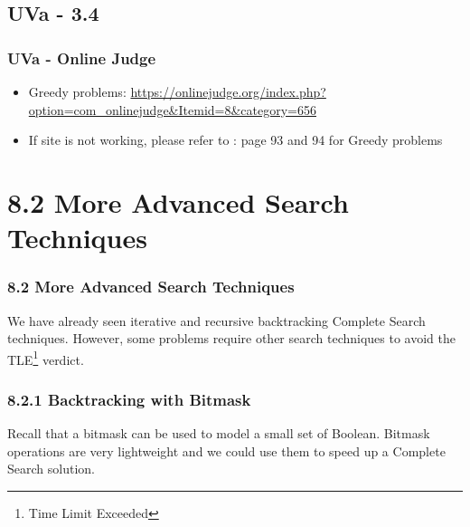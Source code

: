 \documentclass{beamer}
\begin{document}
\subsection{UVa - 3.4}
\begin{frame}[fragile]
\frametitle{UVa - Online Judge}
	\begin{itemize}
	    \item Greedy problems: \url{https://onlinejudge.org/index.php?option=com_onlinejudge&Itemid=8&category=656}
	    \item If site is not working, please refer to \cite{Halim}: page 93 and 94 for Greedy problems
	\end{itemize}
\end{frame}


\section{8.2 More Advanced Search Techniques}

\begin{frame}[fragile]
\frametitle{8.2 More Advanced Search Techniques}

We have already seen iterative and recursive backtracking Complete Search techniques. However, some problems require other search techniques to avoid the TLE\footnote{Time Limit Exceeded} verdict. 

\end{frame}

\begin{frame}[fragile]
\frametitle{8.2.1 Backtracking with Bitmask}

Recall that a bitmask can be used to model a small set of Boolean. Bitmask operations are very lightweight and we could use them to speed up a Complete Search solution.

\end{frame}
\end{document}
